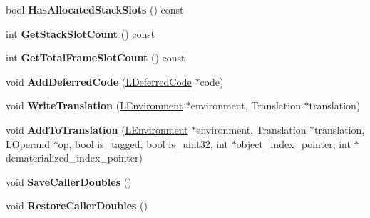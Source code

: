 \begin{DoxyCompactItemize}
\item 
bool {\bfseries Has\+Allocated\+Stack\+Slots} () const \hypertarget{classv8_1_1internal_1_1_l_code_gen_a6a5091a94d97298722ad3509d6fa41ab}{}\label{classv8_1_1internal_1_1_l_code_gen_a6a5091a94d97298722ad3509d6fa41ab}

\item 
int {\bfseries Get\+Stack\+Slot\+Count} () const \hypertarget{classv8_1_1internal_1_1_l_code_gen_ae997141e779eee569145e6d5f4326745}{}\label{classv8_1_1internal_1_1_l_code_gen_ae997141e779eee569145e6d5f4326745}

\item 
int {\bfseries Get\+Total\+Frame\+Slot\+Count} () const \hypertarget{classv8_1_1internal_1_1_l_code_gen_a7e0a34008896a2d4d09dab6f216df9cc}{}\label{classv8_1_1internal_1_1_l_code_gen_a7e0a34008896a2d4d09dab6f216df9cc}

\item 
void {\bfseries Add\+Deferred\+Code} (\hyperlink{classv8_1_1internal_1_1_l_deferred_code}{L\+Deferred\+Code} $\ast$code)\hypertarget{classv8_1_1internal_1_1_l_code_gen_a136807d3acd05ca71821c19ab49ef581}{}\label{classv8_1_1internal_1_1_l_code_gen_a136807d3acd05ca71821c19ab49ef581}

\item 
void {\bfseries Write\+Translation} (\hyperlink{classv8_1_1internal_1_1_l_environment}{L\+Environment} $\ast$environment, Translation $\ast$translation)\hypertarget{classv8_1_1internal_1_1_l_code_gen_aa6c0dc6868c8926d71543f7d35675b7f}{}\label{classv8_1_1internal_1_1_l_code_gen_aa6c0dc6868c8926d71543f7d35675b7f}

\item 
void {\bfseries Add\+To\+Translation} (\hyperlink{classv8_1_1internal_1_1_l_environment}{L\+Environment} $\ast$environment, Translation $\ast$translation, \hyperlink{classv8_1_1internal_1_1_l_operand}{L\+Operand} $\ast$op, bool is\+\_\+tagged, bool is\+\_\+uint32, int $\ast$object\+\_\+index\+\_\+pointer, int $\ast$dematerialized\+\_\+index\+\_\+pointer)\hypertarget{classv8_1_1internal_1_1_l_code_gen_a418f466c19b6671a29663f4378a36d8c}{}\label{classv8_1_1internal_1_1_l_code_gen_a418f466c19b6671a29663f4378a36d8c}

\item 
void {\bfseries Save\+Caller\+Doubles} ()\hypertarget{classv8_1_1internal_1_1_l_code_gen_a668f6d1f7c5aaf43fbfce22898808064}{}\label{classv8_1_1internal_1_1_l_code_gen_a668f6d1f7c5aaf43fbfce22898808064}

\item 
void {\bfseries Restore\+Caller\+Doubles} ()\hypertarget{classv8_1_1internal_1_1_l_code_gen_a094ae8da5b8b7b7d12990d25a4db2272}{}\label{classv8_1_1internal_1_1_l_code_gen_a094ae8da5b8b7b7d12990d25a4db2272}


\end{DoxyCompactItemize}
